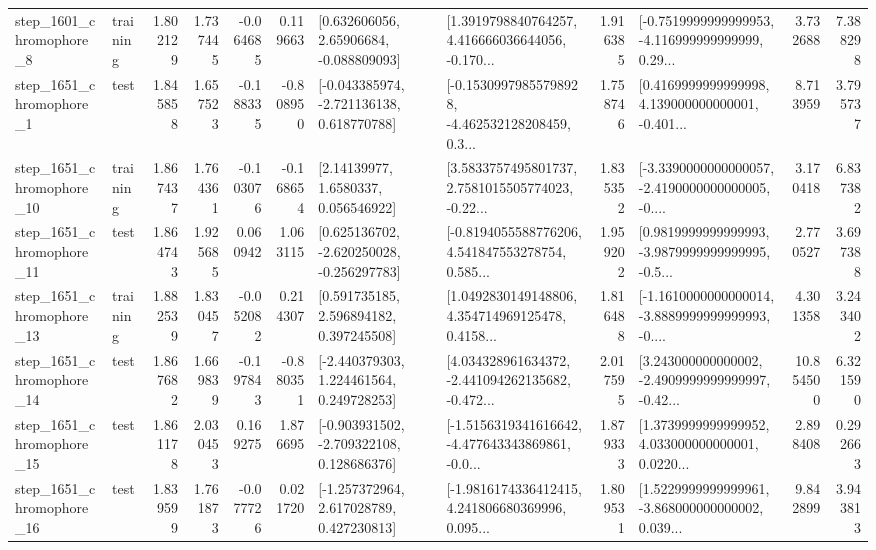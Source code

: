 \begin{tabular}{llrrrrllrlrr}
  step\_1601\_chromophore\_8 &  training &      1.802129 &    1.737445 &     -0.064685 &  0.119663 &     [0.632606056, 2.65906684, -0.088809093] &  [1.3919798840764257, 4.416666036644056, -0.170... &       1.916385 &  [-0.7519999999999953, -4.116999999999999, 0.29... &            3.732688 &          7.388298 \\
  step\_1651\_chromophore\_1 &      test &      1.845858 &    1.657523 &     -0.188335 & -0.808950 &   [-0.043385974, -2.721136138, 0.618770788] &  [-0.15309979855798928, -4.462532128208459, 0.3... &       1.758746 &  [0.4169999999999998, 4.139000000000001, -0.401... &            8.713959 &          3.795737 \\
 step\_1651\_chromophore\_10 &  training &      1.867437 &    1.764361 &     -0.103076 & -0.168654 &        [2.14139977, 1.6580337, 0.056546922] &  [3.5833757495801737, 2.7581015505774023, -0.22... &       1.835352 &  [-3.3390000000000057, -2.4190000000000005, -0.... &            3.170418 &          6.837382 \\
 step\_1651\_chromophore\_11 &      test &      1.864743 &    1.925685 &      0.060942 &  1.063115 &   [0.625136702, -2.620250028, -0.256297783] &  [-0.8194055588776206, 4.541847553278754, 0.585... &       1.959202 &  [0.9819999999999993, -3.9879999999999995, -0.5... &            2.770527 &          3.697388 \\
 step\_1651\_chromophore\_13 &  training &      1.882539 &    1.830457 &     -0.052082 &  0.214307 &     [0.591735185, 2.596894182, 0.397245508] &  [1.0492830149148806, 4.354714969125478, 0.4158... &       1.816488 &  [-1.1610000000000014, -3.8889999999999993, -0.... &            4.301358 &          3.243402 \\
 step\_1651\_chromophore\_14 &      test &      1.867682 &    1.669839 &     -0.197843 & -0.880351 &    [-2.440379303, 1.224461564, 0.249728253] &  [4.034328961634372, -2.441094262135682, -0.472... &       2.017595 &  [3.243000000000002, -2.4909999999999997, -0.42... &           10.854500 &          6.321590 \\
 step\_1651\_chromophore\_15 &      test &      1.861178 &    2.030453 &      0.169275 &  1.876695 &   [-0.903931502, -2.709322108, 0.128686376] &  [-1.5156319341616642, -4.477643343869861, -0.0... &       1.879333 &  [1.3739999999999952, 4.033000000000001, 0.0220... &            2.898408 &          0.292663 \\
 step\_1651\_chromophore\_16 &      test &      1.839599 &    1.761873 &     -0.077726 &  0.021720 &    [-1.257372964, 2.617028789, 0.427230813] &  [-1.9816174336412415, 4.241806680369996, 0.095... &       1.809531 &  [1.5229999999999961, -3.868000000000002, 0.039... &            9.842899 &          3.943813 \\

\end{tabular}
